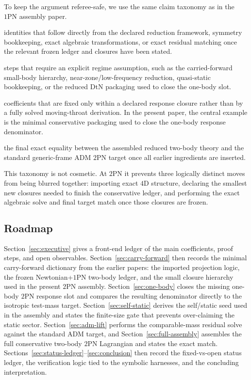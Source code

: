 \documentclass[11pt]{article}
\newcommand{\OnePN}{\mathrm{1PN}}
\newcommand{\TwoPN}{\mathrm{2PN}}
\newcommand{\ADM}{\mathrm{ADM}}
\newcommand{\DtN}{\mathrm{DtN}}
\newcommand{\Exact}{\textbf{Exact}}
\newcommand{\Controlled}{\textbf{Controlled reduction}}
\newcommand{\Protocol}{\textbf{Protocol closure}}
\newcommand{\FullMatch}{\textbf{Full assembly}}
\begin{document}
To keep the argument referee-safe, we use the same claim taxonomy as in the $\OnePN$ assembly paper.
\begin{description}[leftmargin=1.8em,style=nextline]
  \item[\Exact] identities that follow directly from the declared reduction framework, symmetry bookkeeping, exact algebraic transformations, or exact residual matching once the relevant frozen ledger and closures have been stated.
  \item[\Controlled] steps that require an explicit regime assumption, such as the carried-forward small-body hierarchy, near-zone/low-frequency reduction, quasi-static bookkeeping, or the reduced $\DtN$ packaging used to close the one-body slot.
  \item[\Protocol] coefficients that are fixed only within a declared response closure rather than by a fully solved moving-throat derivation.
  In the present paper, the central example is the minimal conservative packaging used to close the one-body response denominator.
  \item[\FullMatch] the final exact equality between the assembled reduced two-body theory and the standard generic-frame $\ADM$ $\TwoPN$ target once all earlier ingredients are inserted.
\end{description}

This taxonomy is not cosmetic.
At $2$PN it prevents three logically distinct moves from being blurred together:
importing exact $4$D structure,
declaring the smallest new closures needed to finish the conservative ledger,
and performing the exact algebraic solve and final target match once those closures are frozen.

\subsection{Roadmap}
\label{sec:intro-roadmap}

Section~\ref{sec:executive} gives a front-end ledger of the main coefficients, proof steps, and open observables.
Section~\ref{sec:carry-forward} then records the minimal carry-forward dictionary from the earlier papers: the imported projection logic, the frozen Newtonian+$\OnePN$ two-body ledger, and the small closure hierarchy used in the present $\TwoPN$ assembly.
Section~\ref{sec:one-body} closes the missing one-body $\TwoPN$ response slot and compares the resulting denominator directly to the isotropic test-mass target.
Section~\ref{sec:self-static} derives the self/static seed used in the assembly and states the finite-size gate that prevents over-claiming the static sector.
Section~\ref{sec:adm-lift} performs the comparable-mass residual solve against the standard $\ADM$ target, and Section~\ref{sec:full-assembly} assembles the full conservative two-body $\TwoPN$ Lagrangian and states the exact match.
Sections~\ref{sec:status-ledger}--\ref{sec:conclusion} then record the fixed-vs-open status ledger, the verification logic tied to the symbolic harnesses, and the concluding interpretation.
\end{document}
